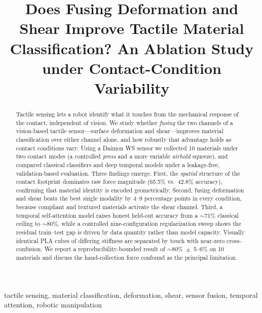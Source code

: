 \documentclass[conference]{IEEEtran}
\begin{document}
\title{Does Fusing Deformation and Shear Improve Tactile Material
Classification? An Ablation Study under Contact-Condition Variability}

\author{
\and
{}
}

\maketitle

\begin{abstract}
Tactile sensing lets a robot identify what it touches from the mechanical
response of the contact, independent of vision. We study whether \emph{fusing}
the two channels of a vision-based tactile sensor---surface deformation and
shear---improves material classification over either channel alone, and how
robustly that advantage holds as contact conditions vary. Using a Daimon WS
sensor we collected 10 materials under two contact modes (a controlled
\emph{press} and a more variable \emph{airhold} squeeze), and compared classical
classifiers and deep temporal models under a leakage-free, validation-based
evaluation. Three findings emerge. First, the \emph{spatial} structure of the
contact footprint dominates raw force magnitude (65.5\% vs.\ 42.8\% accuracy),
confirming that material identity is encoded geometrically. Second, fusing
deformation and shear beats the best single modality by 4--9 percentage points
in every condition, because compliant and textured materials activate the shear
channel. Third, a temporal self-attention model raises honest held-out accuracy
from a $\sim$71\% classical ceiling to $\sim$80\%, while a controlled
nine-configuration regularization sweep shows the residual train--test gap is
driven by data quantity rather than model capacity. Visually identical PLA cubes
of differing stiffness are separated by touch with near-zero cross-confusion. We
report a reproducibility-bounded result of $\sim$80\%~$\pm$~5--6\% on 10
materials and discuss the hand-collection force confound as the principal
limitation.
\end{abstract}

\begin{IEEEkeywords}
tactile sensing, material classification, deformation, shear, sensor fusion,
temporal attention, robotic manipulation
\end{IEEEkeywords}
\end{document}

